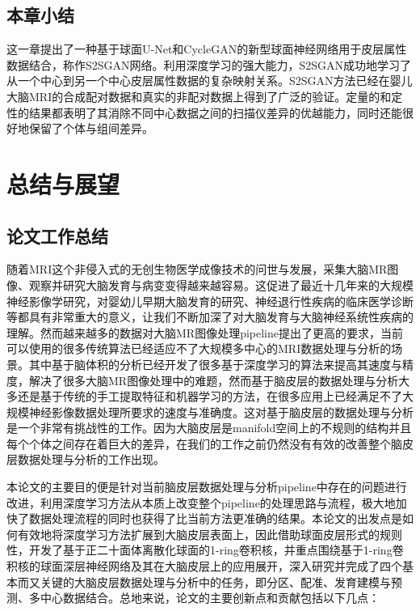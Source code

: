 \section{本章小结}
这一章提出了一种基于球面U-Net和CycleGAN的新型球面神经网络用于皮层属性数据结合，称作S2SGAN网络。利用深度学习的强大能力，S2SGAN成功地学习了从一个中心到另一个中心皮层属性数据的复杂映射关系。S2SGAN方法已经在婴儿大脑MRI的合成配对数据和真实的非配对数据上得到了广泛的验证。定量的和定性的结果都表明了其消除不同中心数据之间的扫描仪差异的优越能力，同时还能很好地保留了个体与组间差异。









\chapter{总结与展望}\label{sec:总结与展望}

\section{论文工作总结}
随着MRI这个非侵入式的无创生物医学成像技术的问世与发展，采集大脑MR图像、观察并研究大脑发育与病变变得越来越容易。这促进了最近十几年来的大规模神经影像学研究，对婴幼儿早期大脑发育的研究、神经退行性疾病的临床医学诊断等都具有非常重大的意义，让我们不断加深了对大脑发育与大脑神经系统性疾病的理解。然而越来越多的数据对大脑MR图像处理pipeline提出了更高的要求，当前可以使用的很多传统算法已经适应不了大规模多中心的MRI数据处理与分析的场景。其中基于脑体积的分析已经开发了很多基于深度学习的算法来提高其速度与精度，解决了很多大脑MR图像处理中的难题，然而基于脑皮层的数据处理与分析大多还是基于传统的手工提取特征和机器学习的方法，在很多应用上已经满足不了大规模神经影像数据处理所要求的速度与准确度。这对基于脑皮层的数据处理与分析是一个非常有挑战性的工作。因为大脑皮层是manifold空间上的不规则的结构并且每个个体之间存在着巨大的差异，在我们的工作之前仍然没有有效的改善整个脑皮层数据处理与分析的工作出现。

本论文的主要目的便是针对当前脑皮层数据处理与分析pipeline中存在的问题进行改进，利用深度学习方法从本质上改变整个pipeline的处理思路与流程，极大地加快了数据处理流程的同时也获得了比当前方法更准确的结果。本论文的出发点是如何有效地将深度学习方法扩展到大脑皮层表面上，因此借助球面皮层形式的规则性，开发了基于正二十面体离散化球面的1-ring卷积核，并重点围绕基于1-ring卷积核的球面深层神经网络及其在大脑皮层上的应用展开，深入研究并完成了四个基本而又关键的大脑皮层数据处理与分析中的任务，即分区、配准、发育建模与预测、多中心数据结合。总地来说，论文的主要创新点和贡献包括以下几点：

